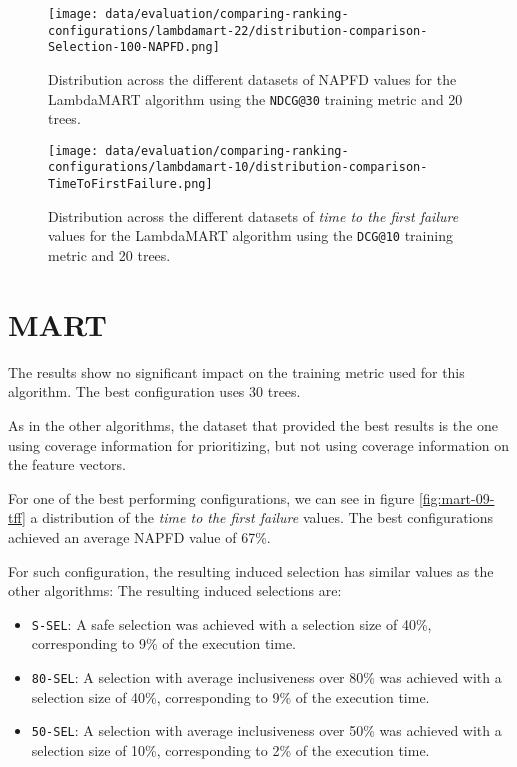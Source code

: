 \begin{figure}
    \centering
    \begin{minipage}{.45\textwidth}
        \centering
        \label{fig:lambdamart-22-napfd}
        \texttt{[image: data/evaluation/comparing-ranking-configurations/lambdamart-22/distribution-comparison-Selection-100-NAPFD.png]}
        \parbox{0.9\textwidth}{\caption{Distribution across the different datasets of NAPFD values for the LambdaMART algorithm using the \texttt{NDCG@30} training metric and 20 trees.}}
    \end{minipage}%
    \begin{minipage}{.45\textwidth}
        \centering
        \label{fig:lambdamart-10-tff}
        \texttt{[image: data/evaluation/comparing-ranking-configurations/lambdamart-10/distribution-comparison-TimeToFirstFailure.png]}
        \parbox{0.9\textwidth}{\caption{Distribution across the different datasets of \emph{time to the first failure} values for the LambdaMART algorithm using the \texttt{DCG@10} training metric and 20 trees.}}
    \end{minipage}%
\end{figure}

\section{MART}
The results show no significant impact on the training metric used for this algorithm. The best configuration uses 30 trees.

As in the other algorithms, the dataset that provided the best results is the one using coverage information for prioritizing, but
not using coverage information on the feature vectors.

For one of the best performing configurations, we can see in figure \ref{fig:mart-09-tff} a distribution of
the \emph{time to the first failure} values. The best configurations achieved an average NAPFD value of 67\%.

For such configuration, the resulting induced selection has similar values as the other algorithms:
The resulting induced selections are:
\begin{itemize}
    \item \texttt{S-SEL}: A safe selection was achieved with a selection size of 40\%, corresponding to 9\% of the execution time.
    \item \texttt{80-SEL}: A selection with average inclusiveness over 80\% was achieved with a selection size of 40\%, corresponding to 9\% of the execution time.
    \item \texttt{50-SEL}: A selection with average inclusiveness over 50\% was achieved with a selection size of 10\%, corresponding to 2\% of the execution time.
\end{itemize}

